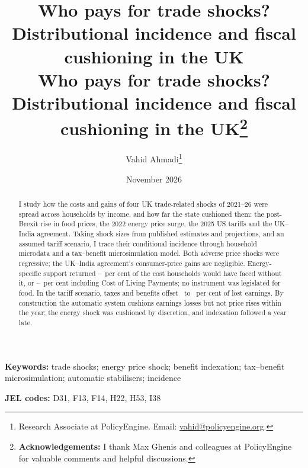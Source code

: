 \documentclass[11pt]{article}
\title{\Large\bfseries Who pays for trade shocks?\\[0.15cm] Distributional incidence and fiscal cushioning in the UK\\[0.7cm]}
\author{}
\title{\Large\bfseries Who pays for trade shocks?\\[0.15cm] Distributional incidence and fiscal cushioning in the UK\thanks{\textbf{Acknowledgements:} I thank Max Ghenis and colleagues at PolicyEngine for valuable comments and helpful discussions.}\\[0.7cm]}
\author{Vahid Ahmadi\thanks{Research Associate at PolicyEngine. Email: \href{mailto:vahid@policyengine.org}{vahid@policyengine.org}.}}
\date{\small November 2026}
\begin{document}
\maketitle

\begin{abstract}
\noindent I study how the costs and gains of four UK trade-related shocks of
2021--26 were spread across households by income, and how far the
state cushioned them: the post-Brexit rise in food
prices, the 2022 energy price surge, the 2025 US tariffs and the
UK--India agreement. Taking shock sizes from published estimates and
projections, and an assumed tariff scenario, I trace their conditional
incidence through household microdata and a tax--benefit microsimulation
model. Both adverse price shocks were regressive; the UK--India
agreement's consumer-price gains are negligible.
Energy-specific support returned \SsEnergySpecificRateMinPct--\SsEnergySpecificRateMaxPct\ per cent of
the cost households would have faced without it, or
\SsFullRateMinPct--\SsFullRateMaxPct\ per cent including Cost of Living Payments;
no instrument was legislated for food. In the
tariff scenario, taxes and benefits offset \EThreeDispTaxBenRatePct\ to
\EThreeWageTaxBenRatePct\ per cent of lost earnings. By construction
the automatic system cushions earnings losses but not price rises
within the year; the energy shock was cushioned by discretion, and
indexation followed a year late.
\end{abstract}

\medskip
\noindent\textbf{Keywords:} trade shocks; energy price shock; benefit indexation; tax--benefit microsimulation; automatic stabilisers; incidence

\smallskip
\noindent\textbf{JEL codes:} D31, F13, F14, H22, H53, I38

\newpage








\clearpage


\clearpage

\end{document}
